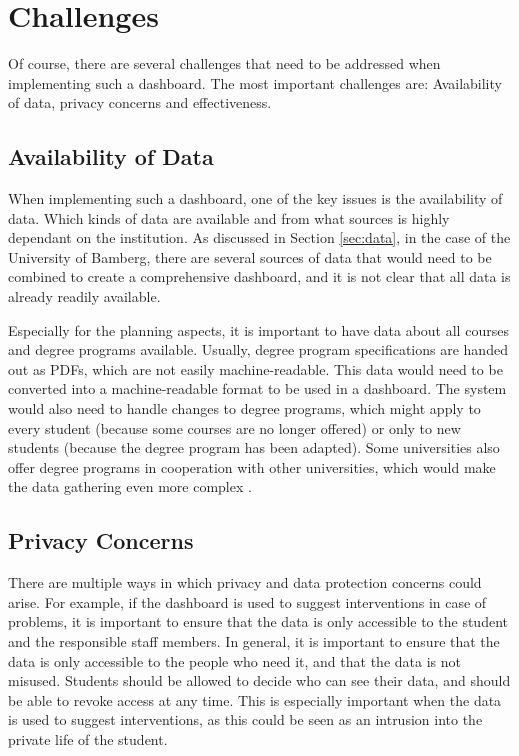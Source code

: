 \section{Challenges}
\label{sec:challenges}

Of course, there are several challenges that need to be addressed when implementing such a dashboard. The most important challenges are: Availability of data, privacy concerns and effectiveness.

\subsection{Availability of Data}

When implementing such a dashboard, one of the key issues is the availability of data. Which kinds of data are available and from what sources is highly dependant on the institution. As discussed in Section \ref{sec:data}, in the case of the University of Bamberg, there are several sources of data that would need to be combined to create a comprehensive dashboard, and it is not clear that all data is already readily available.

Especially for the planning aspects, it is important to have data about all courses and degree programs available. Usually, degree program specifications are handed out as PDFs, which are not easily machine-readable. This data would need to be converted into a machine-readable format to be used in a dashboard. The system would also need to handle changes to degree programs, which might apply to every student (because some courses are no longer offered) or only to new students (because the degree program has been adapted).
Some universities also offer degree programs in cooperation with other universities, which would make the data gathering even more complex \cite{Dashboard-StudentProgress}.

\subsection{Privacy Concerns}
There are multiple ways in which privacy and data protection concerns could arise. For example, if the dashboard is used to suggest interventions in case of problems, it is important to ensure that the data is only accessible to the student and the responsible staff members.
In general, it is important to ensure that the data is only accessible to the people who need it, and that the data is not misused. Students should be allowed to decide who can see their data, and should be able to revoke access at any time. This is especially important when the data is used to suggest interventions, as this could be seen as an intrusion into the private life of the student.

